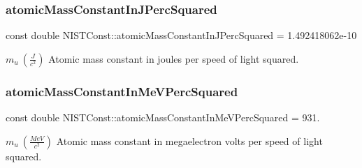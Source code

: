 \subsubsection{\texorpdfstring{atomic\+Mass\+Constant\+In\+J\+Perc\+Squared}{atomicMassConstantInJPercSquared}}
{\footnotesize\ttfamily const double N\+I\+S\+T\+Const\+::atomic\+Mass\+Constant\+In\+J\+Perc\+Squared = 1.\+492418062e-\/10}

$m_u \ (\frac{J}{c^2})$ Atomic mass constant in joules per speed of light squared. \mbox{\label{group___atomic_mass_constant_ga8bf06e408e84fc35515a4d6564407467}} 
\subsubsection{\texorpdfstring{atomic\+Mass\+Constant\+In\+Me\+V\+Perc\+Squared}{atomicMassConstantInMeVPercSquared}}
{\footnotesize\ttfamily const double N\+I\+S\+T\+Const\+::atomic\+Mass\+Constant\+In\+Me\+V\+Perc\+Squared = 931.}

$m_u \ (\frac{MeV}{c^2})$ Atomic mass constant in megaelectron volts per speed of light squared. 